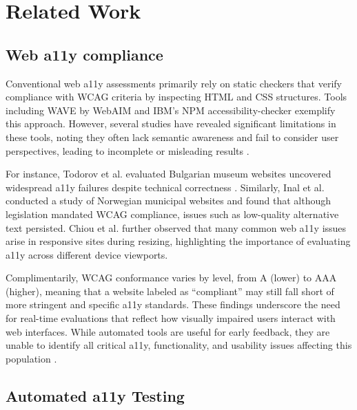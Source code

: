 
\section{Related Work}
\subsection{Web a11y compliance}

Conventional web \ac{a11y} assessments primarily rely on static checkers that verify compliance with \ac{WCAG} criteria by inspecting HTML and CSS structures. Tools including WAVE by WebAIM\cite{webaim_wave_2025} and IBM's NPM accessibility-checker\cite{ibm_accessibility_checker_2025} exemplify this approach. However, several studies have revealed significant limitations in these tools, noting they often lack semantic awareness and fail to consider user perspectives, leading to incomplete or misleading results \cite{ara2024inclusive}. 

For instance, Todorov et al. evaluated Bulgarian museum websites uncovered widespread \ac{a11y} failures despite technical correctness \cite{todorov2022accessibility}. Similarly, Inal et al. conducted a study of Norwegian municipal websites and found that although legislation mandated \ac{WCAG} compliance, issues such as low-quality alternative text persisted.
Chiou et al. further observed that many common web \ac{a11y} issues arise in responsive sites during resizing, highlighting the importance of evaluating \ac{a11y} across different device viewports\cite{chiou2024automatically}.

Complimentarily, \ac{WCAG} conformance varies by level, from A (lower) to AAA (higher), meaning that a website labeled as “compliant” may still fall short of more stringent and specific \ac{a11y} standards. These findings underscore the need for real-time evaluations that reflect how visually impaired users interact with web interfaces. 
While automated tools are useful for early feedback, they are unable to identify all critical \ac{a11y}, functionality, and usability issues affecting this population \cite{todorov2022accessibility}.

\subsection{Automated a11y Testing}

